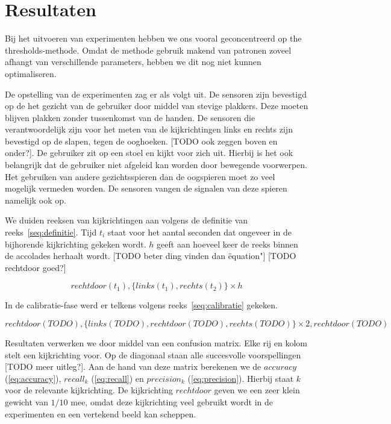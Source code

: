 \documentclass{article}
\begin{document}
\section{Resultaten}
Bij het uitvoeren van experimenten hebben we ons vooral geconcentreerd op the thresholds-methode. Omdat de methode gebruik makend van patronen zoveel afhangt van verschillende parameters, hebben we dit nog niet kunnen optimaliseren.

De opstelling van de experimenten zag er als volgt uit. De sensoren zijn bevestigd op de het gezicht van de gebruiker door middel van stevige plakkers. Deze moeten blijven plakken zonder tussenkomst van de handen. De sensoren die verantwoordelijk zijn voor het meten van de kijkrichtingen links en rechts zijn bevestigd op de slapen, tegen de ooghoeken. [TODO ook zeggen boven en onder?]. De gebruiker zit op een stoel en kijkt voor zich uit. Hierbij is het ook belangrijk dat de gebruiker niet afgeleid kan worden door bewegende voorwerpen. Het gebruiken van andere gezichtsspieren dan de oogspieren moet zo veel mogelijk vermeden worden. De sensoren vangen de signalen van deze spieren namelijk ook op.

We duiden reeksen van kijkrichtingen aan volgens de definitie van reeks~\ref{seq:definitie}. Tijd $t_i$ staat voor het aantal seconden dat ongeveer in de bijhorende kijkrichting gekeken wordt. $h$ geeft aan hoeveel keer de reeks binnen de accolades herhaalt wordt. [TODO beter ding vinden dan \"equation"] [TODO rechtdoor goed?]

\begin{equation}
\label{seq:definitie}
rechtdoor(t_1), \{ links (t_1), rechts (t_2) \} \times h
\end{equation}

In de calibratie-fase werd er telkens volgens reeks~\ref{seq:calibratie} gekeken.

\begin{equation}
\label{seq:calibratie}
rechtdoor(TODO), \{links(TODO), rechtdoor(TODO), rechts(TODO)\} \times 2, rechtdoor(TODO)
\end{equation}

Resultaten verwerken we door middel van een confusion matrix. Elke rij en kolom stelt een kijkrichting voor. Op de diagonaal staan alle succesvolle voorspellingen [TODO meer uitleg?]. Aan de hand van deze matrix berekenen we de $accuracy$ (\ref{eq:accuracy}), $recall_k$ (\ref{eq:recall}) en $precision_k$ (\ref{eq:precision}). Hierbij staat $k$ voor de relevante kijkrichting. De kijkrichting $rechtdoor$ geven we een zeer klein gewicht van $1/10$ mee, omdat deze kijkrichting veel gebruikt wordt in de experimenten en een vertekend beeld kan scheppen.
\end{document}
